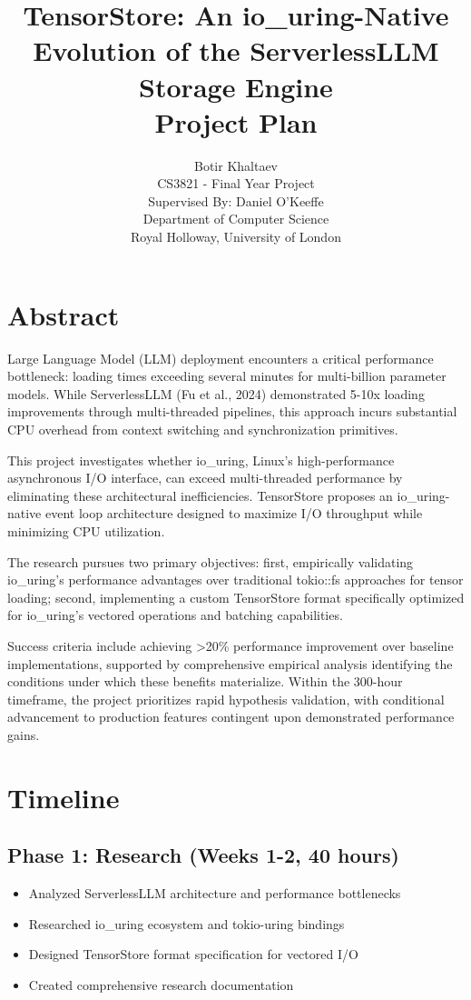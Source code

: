 \documentclass{article}
\title{TensorStore: An io\_uring-Native Evolution of the ServerlessLLM Storage Engine\\
Project Plan}
\author{Botir Khaltaev\\
CS3821 - Final Year Project\\
Supervised By: Daniel O'Keeffe\\
Department of Computer Science\\
Royal Holloway, University of London}
\date{}
\begin{document}
\maketitle

\section{Abstract}

Large Language Model (LLM) deployment encounters a critical performance bottleneck: loading times exceeding several minutes for multi-billion parameter models. While ServerlessLLM (Fu et al., 2024) demonstrated 5-10x loading improvements through multi-threaded pipelines, this approach incurs substantial CPU overhead from context switching and synchronization primitives.

This project investigates whether io\_uring, Linux's high-performance asynchronous I/O interface, can exceed multi-threaded performance by eliminating these architectural inefficiencies. TensorStore proposes an io\_uring-native event loop architecture designed to maximize I/O throughput while minimizing CPU utilization.

The research pursues two primary objectives: first, empirically validating io\_uring's performance advantages over traditional tokio::fs approaches for tensor loading; second, implementing a custom TensorStore format specifically optimized for io\_uring's vectored operations and batching capabilities.

Success criteria include achieving >20\% performance improvement over baseline implementations, supported by comprehensive empirical analysis identifying the conditions under which these benefits materialize. Within the 300-hour timeframe, the project prioritizes rapid hypothesis validation, with conditional advancement to production features contingent upon demonstrated performance gains.

\section{Timeline}


\subsection{Phase 1: Research (Weeks 1-2, 40 hours)}

\begin{itemize}
\item Analyzed ServerlessLLM architecture and performance bottlenecks
\item Researched io\_uring ecosystem and tokio-uring bindings
\item Designed TensorStore format specification for vectored I/O
\item Created comprehensive research documentation
\end{itemize}
\end{document}
